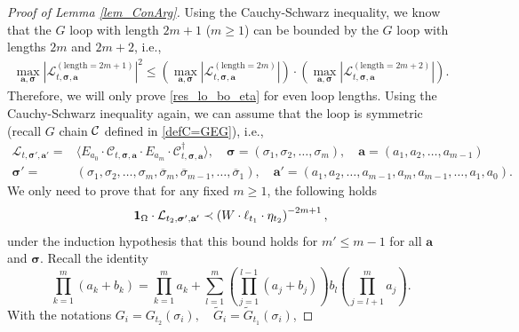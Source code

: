 \documentclass[10pt,reqno]{article}
\renewcommand{\bar}{\overline}
\theoremstyle{plain} %
\theoremstyle{remark}
\numberwithin{equation}{section}
\begin{document}
 
\begin{proof}[Proof of Lemma \ref{lem_ConArg}]
Using the Cauchy-Schwarz inequality, we know that the $G$ loop with length $2m+1$ ($m\ge 1$) can be bounded by the $G$ loop with lengths $2m$ and $2m+2$, i.e.,
\begin{align}\label{adummzps}
    \max_{\textbf{a}, \boldsymbol{\sigma}} \left|\mathcal{L}^{(\text{length} = 2m+1)}_{t, \boldsymbol{\sigma}, \textbf{a}}\right|^2 \le \left(\max_{\textbf{a}, \boldsymbol{\sigma}} \left|\mathcal{L}^{(\text{length} = 2m)}_{t, \boldsymbol{\sigma}, \textbf{a}}\right|\right) \cdot \left(\max_{\textbf{a}, \boldsymbol{\sigma}} \left|\mathcal{L}^{(\text{length} = 2m+2)}_{t, \boldsymbol{\sigma}, \textbf{a}}\right|\right).  
  \end{align}
Therefore, we will only prove \eqref{res_lo_bo_eta} for even loop lengths. Using the Cauchy-Schwarz inequality again, we can assume that the loop is symmetric (recall $G$ chain $\cal C$ defined in \eqref{defC=GEG}), i.e., 
\begin{align}\label{sym_calL}
        \mathcal{L}_{t, \boldsymbol{\sigma}', \textbf{a}'} = & \langle E_{a_0} \cdot \mathcal{C}_{t, \boldsymbol{\sigma}, \textbf{a}} \cdot E_{a_m} \cdot \mathcal{C}^\dagger_{t, \boldsymbol{\sigma}, \textbf{a}} \rangle, \quad \boldsymbol{\sigma} = (\sigma_1, \sigma_2, \ldots, \sigma_m), \quad \textbf{a} = (a_1, a_2, \ldots, a_{m-1}) \nonumber \\
 \boldsymbol{\sigma}' = & (\sigma_1, \sigma_2, \ldots, \sigma_m, \bar{\sigma}_m, \bar{\sigma}_{m-1}, \ldots, \bar{\sigma}_1), \quad \textbf{a}' = ( a_1, a_2, \ldots, a_{m-1}, a_m, a_{m-1}, \ldots, a_1, a_0).
\end{align}
We only need to prove that for any fixed $m\ge 1$, the following holds 
\begin{equation}\label{eq_main_ConAr}
        {\bf 1}_{\Omega}\cdot  \mathcal{L}_{t_2, \boldsymbol{\sigma}', \textbf{a}'}
        \prec
        \left( W \cdot \ell_{t_1}\cdot \eta_{t_2} \right)^{-2m+1},
\end{equation}
under the induction hypothesis that this bound holds for $  m' \le m-1$  for all $\textbf{a}$ and $\boldsymbol{\sigma}$.
Recall  the identity 
\begin{equation}\label{abform1}
        \prod_{k=1}^m (a_k + b_k) = \prod_{k=1}^m a_k + \sum_{l=1}^m \left(\prod_{j=1}^{l-1} (a_j + b_j)\right) b_l \left(\prod_{j=l+1}^m a_j\right). 
\end{equation}
With the notations $ G_i = G_{t_2}(\sigma_i), \quad \widetilde{G}_i = {\widetilde G}_{t_1}(\sigma_i)$, 

\end{proof}
\end{document}

